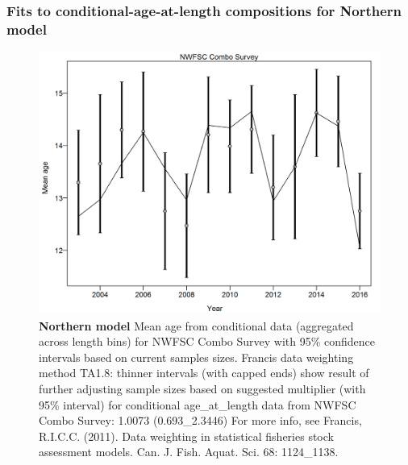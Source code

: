 \documentclass[12pt,]{article}
\begin{document}
\FloatBarrier

\newpage

\subsubsection{Fits to conditional-age-at-length compositions for
Northern
model}\label{fits-to-conditional-age-at-length-compositions-for-northern-model}

\begin{figure}[htbp]
\centering
\includegraphics{./r4ss/plots_mod1/comp_condAALfit_data_weighting_TA1.8_condAgeNWFSC Combo Survey.png}
\caption{\textbf{Northern model} Mean age from conditional data
(aggregated across length bins) for NWFSC Combo Survey with 95\%
confidence intervals based on current samples sizes. Francis data
weighting method TA1.8: thinner intervals (with capped ends) show result
of further adjusting sample sizes based on suggested multiplier (with
95\% interval) for conditional age\_at\_length data from NWFSC Combo
Survey: 1.0073 (0.693\_2.3446) For more info, see Francis, R.I.C.C.
(2011). Data weighting in statistical fisheries stock assessment models.
Can. J. Fish. Aquat. Sci. 68: 1124\_1138.
\label{fig:mod1_3_comp_condAALfit_data_weighting_TA1.8_condAgeNWFSC Combo Survey}}
\end{figure}
\end{document}

